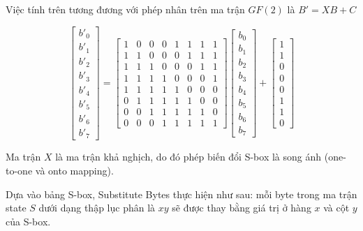\documentclass[a5paper]{article}
\begin{document}
    Việc tính trên tương đương với phép nhân trên ma trận $GF(2)$ là $B' = XB + C$

    \[ \begin{bmatrix}
        b'_0 \\ b'_1 \\ b'_2 \\ b'_3 \\ b'_4 \\ b'_5 \\ b'_6 \\ b'_7
    \end{bmatrix} = 
    \begin{bmatrix}
        1 & 0 & 0 & 0 & 1 & 1 & 1 & 1 \\
        1 & 1 & 0 & 0 & 0 & 1 & 1 & 1 \\
        1 & 1 & 1 & 0 & 0 & 0 & 1 & 1 \\
        1 & 1 & 1 & 1 & 0 & 0 & 0 & 1 \\
        1 & 1 & 1 & 1 & 1 & 0 & 0 & 0 \\
        0 & 1 & 1 & 1 & 1 & 1 & 0 & 0 \\
        0 & 0 & 1 & 1 & 1 & 1 & 1 & 0 \\
        0 & 0 & 0 & 1 & 1 & 1 & 1 & 1
    \end{bmatrix} 
    \begin{bmatrix}
        b_0 \\ b_1 \\ b_2 \\ b_3 \\ b_4 \\ b_5 \\ b_6 \\ b_7
    \end{bmatrix} + 
    \begin{bmatrix}
        1 \\ 1 \\ 0 \\ 0 \\ 0 \\ 1 \\ 1 \\ 0
    \end{bmatrix}\]

    Ma trận $X$ là ma trận khả nghịch, do đó phép biến đổi S-box là song ánh (one-to-one và onto mapping).

    Dựa vào bảng S-box, Substitute Bytes thực hiện như sau: mỗi byte trong ma trận state $S$ dưới dạng thập lục phân là $xy$ sẽ được thay bằng giá trị ở hàng $x$ và cột $y$ của S-box.
\end{document}
